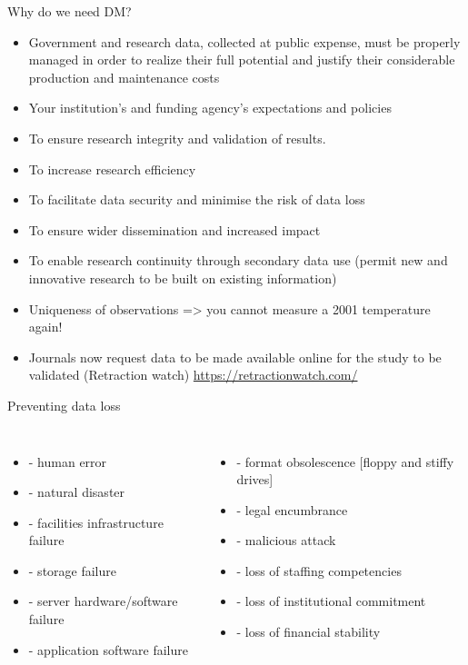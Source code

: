 \documentclass[english,aspectratio=169]{beamer}
\begin{document}
\begin{frame}{Why do we need DM?}
\begin{itemize}
\item Government and research data, collected at public expense, must be properly managed in order to realize their full potential and justify their considerable production and maintenance costs
\item Your institution's and funding agency's expectations and policies
\item To ensure research integrity and validation of results.
\item To increase research efficiency
\item To facilitate data security and minimise the risk of data loss
\item To ensure wider dissemination and increased impact
\item To enable research continuity through secondary data use (permit new and innovative research to be built on existing information)
\item Uniqueness of observations => you cannot measure a 2001 temperature again!
\item Journals now request data to be made available online for the study to be validated (Retraction watch) \href{https://retractionwatch.com/}{https://retractionwatch.com/} 
\end{itemize}
\end{frame}

\begin{frame}{Preventing data loss}
\begin{columns}[t]

\column{6cm}
\begin{itemize}
\item - human error
\item - natural disaster
\item - facilities infrastructure failure
\item - storage failure
\item - server hardware/software failure
\item - application software failure
\end{itemize}

\column{6cm}
\begin{itemize}
\item - format obsolescence {[}floppy and stiffy drives{]}
\item - legal encumbrance
\item - malicious attack
\item - loss of staffing competencies
\item - loss of institutional commitment
\item - loss of financial stability
\end{itemize}
\end{columns}

\end{frame}
\end{document}

